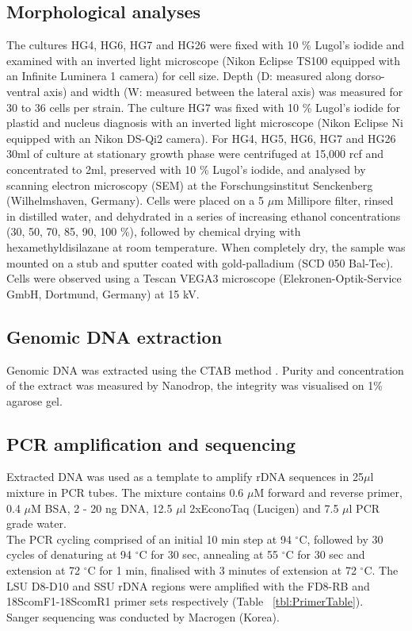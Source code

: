 \documentclass[12pt]{article}
\begin{document}
\subsection{Morphological analyses}
The cultures HG4, HG6, HG7 and HG26 were fixed with 10 \% Lugol's iodide and examined with an inverted light microscope (Nikon Eclipse TS100 equipped with an Infinite Luminera 1 camera) for cell size. Depth (D: measured along dorso-ventral axis) and width (W: measured between the lateral axis) was measured for 30 to 36 cells per strain.
The culture HG7 was fixed with 10 \% Lugol's iodide for plastid and nucleus diagnosis with an inverted light microscope (Nikon Eclipse Ni equipped with an Nikon DS-Qi2 camera).
For HG4, HG5, HG6, HG7 and HG26 30ml of culture at stationary growth phase were centrifuged at 15,000 rcf and concentrated to 2ml, preserved with 10 \% Lugol's iodide, and analysed by scanning electron microscopy (SEM) at the Forschungsinstitut Senckenberg (Wilhelmshaven, Germany). 
Cells were placed on a 5 $\mu$m Millipore filter, rinsed in distilled water, and dehydrated in a series of increasing ethanol concentrations (30, 50, 70, 85, 90, 100 \%), followed by chemical drying with hexamethyldisilazane at room temperature. When completely dry, the sample was mounted on a stub and sputter coated with gold-palladium (SCD 050 Bal-Tec). Cells were observed using a Tescan VEGA3 microscope (Elekronen-Optik-Service GmbH, Dortmund, Germany) at 15 kV.

\subsection{Genomic DNA extraction}
Genomic DNA was extracted using the CTAB method \citep{zhou1999analysis}. Purity and concentration of the extract was measured by Nanodrop, the integrity was visualised on 1\% agarose gel.

\subsection{PCR amplification and sequencing}
Extracted DNA was used as a template to amplify rDNA sequences in 25$\mu$l mixture in PCR tubes. The mixture contains 0.6 $\mu$M forward and reverse primer, 0.4 $\mu$M BSA, 2 - 20 ng DNA, 12.5 $\mu$l 2xEconoTaq (Lucigen) and 7.5 $\mu$l PCR grade water.\\
The PCR cycling comprised of an initial 10 min step at 94 $^{\circ}$C, followed by 30 cycles of denaturing at 94 $^{\circ}$C for 30 sec, annealing at 55 $^{\circ}$C for 30 sec and extension at 72 $^{\circ}$C for 1 min, finalised with 3 minutes of extension at 72 $^{\circ}$C.
The LSU D8-D10 and SSU rDNA regions were amplified with the FD8-RB and 18ScomF1-18ScomR1 primer sets respectively (Table ~\ref{tbl:PrimerTable}).\\
Sanger sequencing was conducted by Macrogen (Korea).
\end{document}
